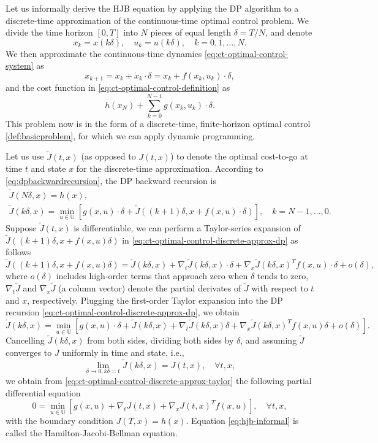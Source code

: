 \documentclass[
]{book}
\theoremstyle{definition}
\theoremstyle{definition}
\theoremstyle{definition}
\theoremstyle{definition}
\theoremstyle{remark}
\begin{document}
Let us informally derive the HJB equation by applying the DP algorithm to a discrete-time approximation of the continuous-time optimal control problem. We divide the time horizon \([0,T]\) into \(N\) pieces of equal length \(\delta = T/N\), and denote
\[
x_k = x(k\delta), \quad u_k = u(k \delta), \quad k = 0,1,\dots,N.
\]
We then approximate the continuous-time dynamics \eqref{eq:ct-optimal-control-system} as
\[
x_{k+1} = x_k + \dot{x}_k \cdot \delta = x_k + f(x_k,u_k) \cdot \delta,
\]
and the cost function in \eqref{eq:ct-optimal-control-definition} as
\[
h(x_N) + \sum_{k=0}^{N-1} g(x_k, u_k)\cdot \delta.
\]
This problem now is in the form of a discrete-time, finite-horizon optimal control \ref{def:basicproblem}, for which we can apply dynamic programming.

Let us use \(\tilde{J}(t,x)\) (as opposed to \(J(t,x)\)) to denote the optimal cost-to-go at time \(t\) and state \(x\) for the discrete-time approximation. According to \eqref{eq:dpbackwardrecursion}, the DP backward recursion is
\begin{align}
\tilde{J}(N\delta,x) = h(x), \\
\tilde{J}(k\delta,x) = \min_{u \in \mathbb{U}} \left[ g(x,u)\cdot \delta + \tilde{J}((k+1)\delta,x + f(x,u)\cdot \delta)  \right], \quad k = N-1,\dots,0.
\label{eq:ct-optimal-control-discrete-approx-dp}
\end{align}
Suppose \(\tilde{J}(t,x)\) is differentiable, we can perform a Taylor-series expansion of \(\tilde{J}((k+1)\delta,x+f(x,u)\delta)\) in \eqref{eq:ct-optimal-control-discrete-approx-dp} as follows
\[
\tilde{J}((k+1)\delta,x+f(x,u)\delta) = \tilde{J}(k\delta,x) + \nabla_t \tilde{J} (k\delta,x) \cdot \delta + \nabla_x \tilde{J}(k\delta,x)^T f(x,u) \cdot \delta + o(\delta),
\]
where \(o(\delta)\) includes high-order terms that approach zero when \(\delta\) tends to zero, \(\nabla_t \tilde{J}\) and \(\nabla_x \tilde{J}\) (a column vector) denote the partial derivates of \(\tilde{J}\) with respect to \(t\) and \(x\), respectively. Plugging the first-order Taylor expansion into the DP recursion \eqref{eq:ct-optimal-control-discrete-approx-dp}, we obtain
\begin{equation}
\tilde{J}(k\delta,x) = \min_{u \in \mathbb{U}} \left[ g(x,u) \cdot \delta + \tilde{J}(k \delta,x) + \nabla_t \tilde{J}(k \delta,x) \delta + \nabla_x \tilde{J}(k\delta,x)^T f(x,u) \delta + o(\delta)  \right].
\label{eq:ct-optimal-control-discrete-approx-taylor}
\end{equation}
Cancelling \(\tilde{J}(k \delta,x)\) from both sides, dividing both sides by \(\delta\), and assuming \(\tilde{J}\) converges to \(J\) uniformly in time and state, i.e.,
\[
\lim_{\delta \rightarrow 0, k\delta = t} \tilde{J}(k\delta,x) = J(t,x), \quad \forall t,x,
\]
we obtain from \eqref{eq:ct-optimal-control-discrete-approx-taylor} the following partial differential equation
\begin{equation}
0 = \min_{u \in \mathbb{U}} \left[ g(x,u) + \nabla_t J(t,x) + \nabla_x J(t,x)^T f(x,u)  \right], \quad \forall t, x,
\label{eq:hjb-informal}
\end{equation}
with the boundary condition \(J(T,x) = h(x)\). Equation \eqref{eq:hjb-informal} is called the Hamilton-Jacobi-Bellman equation.
\end{document}
